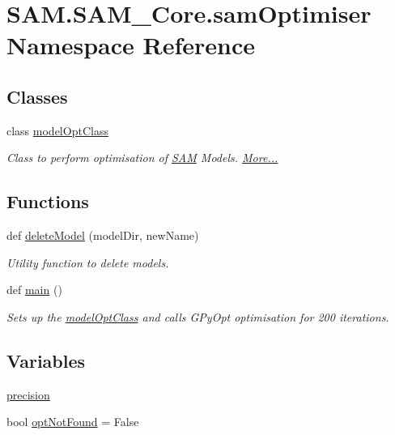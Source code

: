\hypertarget{namespaceSAM_1_1SAM__Core_1_1samOptimiser}{}\section{S\+A\+M.\+S\+A\+M\+\_\+\+Core.\+sam\+Optimiser Namespace Reference}
\label{namespaceSAM_1_1SAM__Core_1_1samOptimiser}
\subsection*{Classes}
\begin{DoxyCompactItemize}
\item 
class \hyperlink{group__icubclient__SAM__Core_classSAM_1_1SAM__Core_1_1samOptimiser_1_1modelOptClass}{model\+Opt\+Class}
\begin{DoxyCompactList}\small\item\em Class to perform optimisation of \hyperlink{namespaceSAM}{S\+AM} Models.  \hyperlink{group__icubclient__SAM__Core_classSAM_1_1SAM__Core_1_1samOptimiser_1_1modelOptClass}{More...}\end{DoxyCompactList}\end{DoxyCompactItemize}
\subsection*{Functions}
\begin{DoxyCompactItemize}
\item 
def \hyperlink{namespaceSAM_1_1SAM__Core_1_1samOptimiser_aaa1732931d8935e827164fbc742a6bc0}{delete\+Model} (model\+Dir, new\+Name)
\begin{DoxyCompactList}\small\item\em Utility function to delete models. \end{DoxyCompactList}\item 
def \hyperlink{namespaceSAM_1_1SAM__Core_1_1samOptimiser_a67ff14e060a0779ce9ecadee717d76a5}{main} ()
\begin{DoxyCompactList}\small\item\em Sets up the \hyperlink{group__icubclient__SAM__Core_classSAM_1_1SAM__Core_1_1samOptimiser_1_1modelOptClass}{model\+Opt\+Class} and calls G\+Py\+Opt optimisation for 200 iterations. \end{DoxyCompactList}\end{DoxyCompactItemize}
\subsection*{Variables}
\begin{DoxyCompactItemize}
\item 
\hyperlink{namespaceSAM_1_1SAM__Core_1_1samOptimiser_a9dbac1c83d2aee8db8fe3a941547e71e}{precision}
\item 
bool \hyperlink{namespaceSAM_1_1SAM__Core_1_1samOptimiser_a5711439302add7b6791b1fb732529f06}{opt\+Not\+Found} = False
\end{DoxyCompactItemize}


